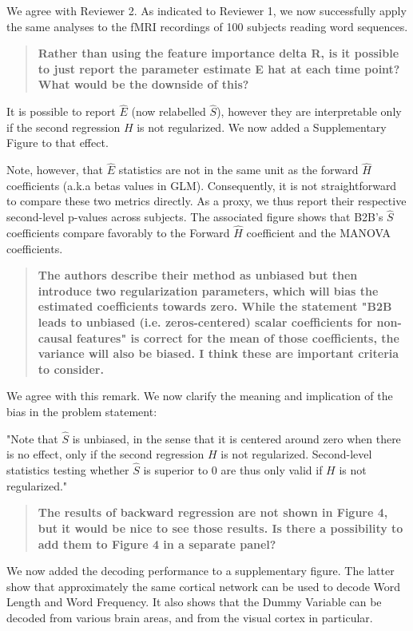 \documentclass[preprint,12pt,3p]{elsarticle}
\begin{document}
We agree with Reviewer 2. As indicated to Reviewer 1, we now successfully apply
the same analyses to the fMRI recordings of 100 subjects reading word sequences.

\begin{quote}\textbf{
Rather than using the feature importance delta R, is it possible to just
    report the parameter estimate E hat at each time point? What would be the
    downside of this?
}
\end{quote}

It is possible to report $\hat E$ (now relabelled $\hat S$), however they are
interpretable only if the second regression $H$ is not regularized.
We now added a Supplementary Figure to that effect.

Note, however, that $\hat E$ statistics are not in the same unit as the forward $\hat H$
coefficients (a.k.a betas values in GLM). Consequently, it is not straightforward to
compare these two metrics directly. As a proxy, we thus report their respective
second-level p-values across subjects. The associated figure shows that B2B's $\hat S$
coefficients compare favorably to the Forward $\hat H$ coefficient and the MANOVA
coefficients.


\begin{quote}\textbf{
The authors describe their method as unbiased but then introduce two
    regularization parameters, which will bias the estimated coefficients towards
    zero. While the statement "B2B leads to unbiased (i.e. zeros-centered) scalar
    coefficients for non-causal features" is correct for the mean of those
    coefficients, the variance will also be biased. I think these are important
    criteria to consider.
}
\end{quote}

We agree with this remark. We now clarify the meaning and implication of the
bias in the problem statement:

"Note that $\hat S$ is unbiased, in the sense that it is centered around zero when there is no
effect, only if the second regression $H$ is not regularized. Second-level
statistics testing whether $\hat S$ is superior to 0 are thus only valid if $H$
is not regularized."

\begin{quote}\textbf{
The results of backward regression are not shown in Figure 4, but it would be
    nice to see those results. Is there a possibility to add them to Figure 4 in a
    separate panel?
}
\end{quote}
We now added the decoding performance to a supplementary figure. The latter show
that approximately the same cortical network can be used to decode Word Length
and Word Frequency. It also shows that the Dummy Variable can be decoded from
various brain areas, and from the visual cortex in particular.
\end{document}
